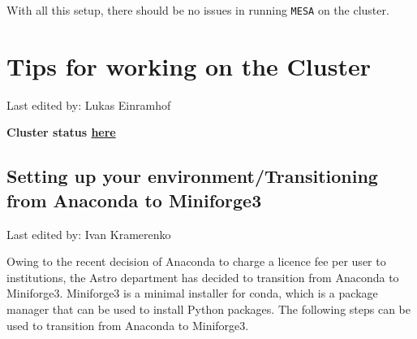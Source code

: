 \documentclass{article}
\newcommand{\setlasteditor}[1]{\gdef\lasteditor{#1}}
\newcommand{\lastedited}{%
    \vspace{1mm} {\footnotesize Last edited by: \lasteditor} \vspace{3mm}
    \newline

}
\begin{document}
With all this setup, there should be no issues in running \texttt{MESA} on the cluster.



\section{Tips for working on the Cluster}
\setlasteditor{Lukas Einramhof}
\lastedited

\textbf{Cluster status \href{https://hpc-dashboards.ista.ac.at/public-dashboards/51f8f8a9ea67404fa74d9b1e5993e3e6?orgId=1}{here}}

\subsection{Setting up your environment/Transitioning from Anaconda to Miniforge3}
\setlasteditor{Ivan Kramerenko}
\lastedited
Owing to the recent decision of Anaconda to charge a licence fee per user to institutions, the Astro department has decided to transition from Anaconda to Miniforge3. Miniforge3 is a minimal installer for conda, which is a package manager that can be used to install Python packages. The following steps can be used to transition from Anaconda to Miniforge3.
\end{document}
